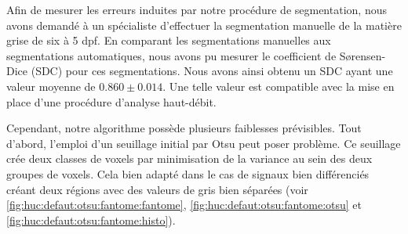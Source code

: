 \documentclass[\main/main.tex]{subfiles}
\begin{document}
Afin de mesurer les erreurs induites par notre procédure de segmentation, nous avons demandé à un spécialiste d'effectuer la segmentation manuelle de la matière grise de six \pzs{} à 5 dpf.
%
En comparant les segmentations manuelles aux segmentations automatiques, nous avons pu mesurer le coefficient de S\o rensen-Dice (SDC) pour ces segmentations.
%
Nous avons ainsi obtenu un SDC ayant une valeur moyenne de $0.860 \pm{0.014}$.
%
Une telle valeur est compatible avec la mise en place d'une procédure d'analyse haut-débit.

%
Cependant, notre algorithme possède plusieurs faiblesses prévisibles. Tout d'abord, l'emploi d'un seuillage initial par Otsu peut poser problème. Ce seuillage crée deux classes de voxels par minimisation de la variance au sein des deux groupes de voxels. Cela bien adapté dans le cas de signaux bien différenciés créant deux régions avec des valeurs de gris bien séparées
(voir \autoref{fig:huc:defaut:otsu:fantome:fantome},
\autoref{fig:huc:defaut:otsu:fantome:otsu}
et \autoref{fig:huc:defaut:otsu:fantome:histo}).
\end{document}
